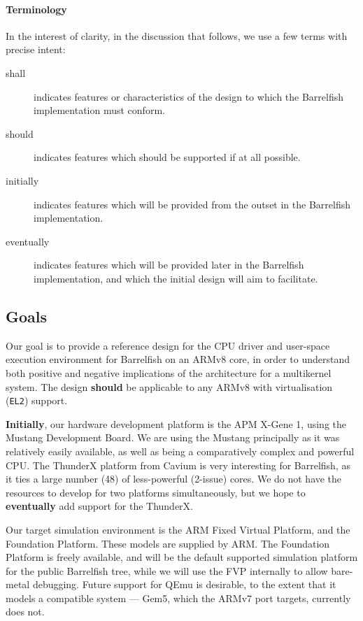 \documentclass[a4paper,twoside]{report}
\begin{document}
\paragraph{Terminology}
In the interest of clarity, in the discussion that follows, we use a few terms
with precise intent:
\begin{description}
\item[shall]
    indicates features or characteristics of the design to which the
    Barrelfish implementation must conform.
\item[should]
    indicates features which should be supported if at all possible.
\item[initially]
    indicates features which will be provided from the outset in the
    Barrelfish implementation.
\item[eventually]
    indicates features which will be provided later in the Barrelfish
    implementation, and which the initial design will aim to facilitate.
\end{description}

\subsection{Goals}

Our goal is to provide a reference design for the CPU driver and user-space
execution environment for Barrelfish on an ARMv8 core, in order to understand
both positive and negative implications of the architecture for a multikernel
system.  The design \textbf{should} be applicable to any ARMv8 with
virtualisation (\texttt{EL2}) support.

\textbf{Initially}, our hardware development platform is the APM X-Gene 1,
using the Mustang Development Board. We are using the Mustang principally as
it was relatively easily available, as well as being a comparatively complex
and powerful CPU. The ThunderX platform from Cavium is very interesting for
Barrelfish, as it ties a large number (48) of less-powerful (2-issue) cores.
We do not have the resources to develop for two platforms simultaneously, but
we hope to \textbf{eventually} add support for the ThunderX.

Our target simulation environment is the ARM Fixed Virtual Platform, and the
Foundation Platform. These models are supplied by ARM. The Foundation Platform
is freely available, and will be the default supported simulation platform for
the public Barrelfish tree, while we will use the FVP internally to allow
bare-metal debugging. Future support for QEmu is desirable, to the extent that
it models a compatible system --- Gem5, which the ARMv7 port targets,
currently does not.
\end{document}
